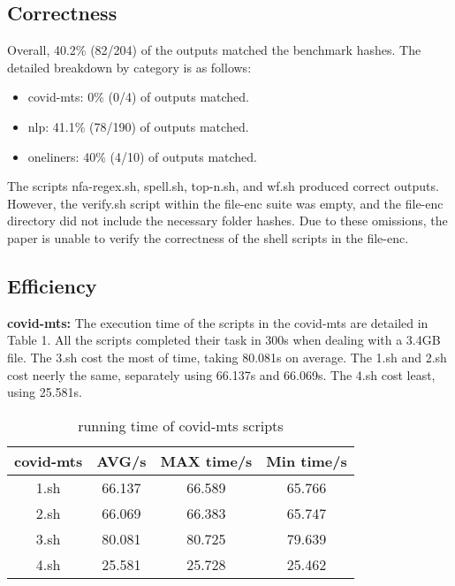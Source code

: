 \documentclass[sigplan, screen, 10pt]{acmart}
\begin{document}
\subsection{Correctness}
Overall, 40.2\% (82/204) of the outputs matched the benchmark hashes. The detailed breakdown by category is as follows:
\begin{itemize}
    \item covid-mts: 0\% (0/4) of outputs matched.
    \item nlp: 41.1\% (78/190) of outputs matched.
    \item oneliners: 40\% (4/10) of outputs matched.
\end{itemize}
The scripts nfa-regex.sh, spell.sh, top-n.sh, and wf.sh produced correct outputs.
However, the verify.sh script within the file-enc suite was empty, and the file-enc directory did not include the necessary folder hashes.
Due to these omissions, the paper is unable to verify the correctness of the shell scripts in the file-enc.\newline


\subsection{Efficiency}
\textbf{covid-mts:}
The execution time of the scripts in the covid-mts are detailed in Table 1.
All the scripts completed their task in 300s when dealing with a 3.4GB file.
The 3.sh cost the most of time, taking 80.081s on average.
The 1.sh and 2.sh cost neerly the same, separately using 66.137s and 66.069s.
The 4.sh cost least, using 25.581s.\newline
 
\begin{table}[]
    \centering
    \begin{tabular}{c|c|c|c}
         \textbf{covid-mts}& \textbf{AVG/s} & \textbf{MAX time/s} & \textbf{Min time/s} \\
         \hline
         1.sh & 66.137 & 66.589 & 65.766 \\
         2.sh & 66.069 & 66.383 & 65.747\\
         3.sh & 80.081 & 80.725 & 79.639 \\
         4.sh & 25.581 & 25.728 & 25.462 \\
         \hline
    \end{tabular}
    \caption{running time of covid-mts scripts}
\end{table}
\end{document}
